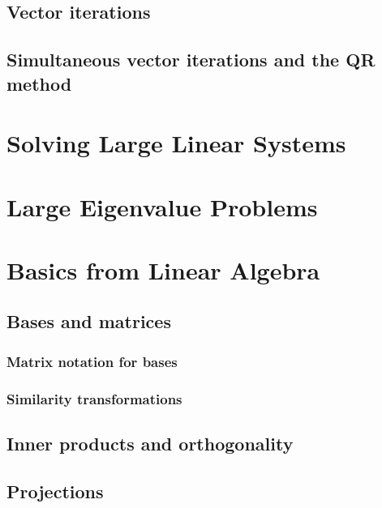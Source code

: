 \section{Vector iterations}

\section{Simultaneous vector iterations and the QR method}

%

\chapter{Solving Large Linear Systems}

\chapter{Large Eigenvalue Problems}

\appendix
\chapter{Basics from Linear Algebra}
\section{Bases and matrices}
\subsection{Matrix notation for bases}

\subsection{Similarity transformations}

\section{Inner products and orthogonality}

\section{Projections}



\printindex


